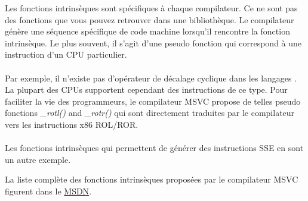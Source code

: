 ﻿
\label{sec:compiler_intrinsic}


Les fonctions intrinsèques sont spécifiques à chaque compilateur. Ce ne sont pas des fonctions que
vous pouvez retrouver dans une bibliothèque.
Le compilateur génère une séquence spécifique de code machine lorsqu'il rencontre la fonction
intrinsèque. Le plus souvent, il s'agit d'une pseudo fonction qui correspond à une instruction d'un
\ac{CPU} particulier.\\
\\
Par exemple, il n'existe pas d'opérateur de décalage cyclique dans les langages \CCpp. La plupart
des \ac{CPU}s supportent cependant des instructions de ce type.
Pour faciliter la vie des programmeurs, le compilateur MSVC propose de telles pseudo fonctions
\emph{\_rotl()} and \emph{\_rotr()}\FNMSDNROTxURL{}
qui sont directement traduites par le compilateur vers les instructions x86 ROL/ROR. \\
\\
Les fonctions intrinsèques qui permettent de générer des instructions SSE en sont un autre exemple.

La liste complète des fonctions intrinsèques proposées par le compilateur MSVC figurent dans le
\href{http://go.yurichev.com/17254}{MSDN}.

